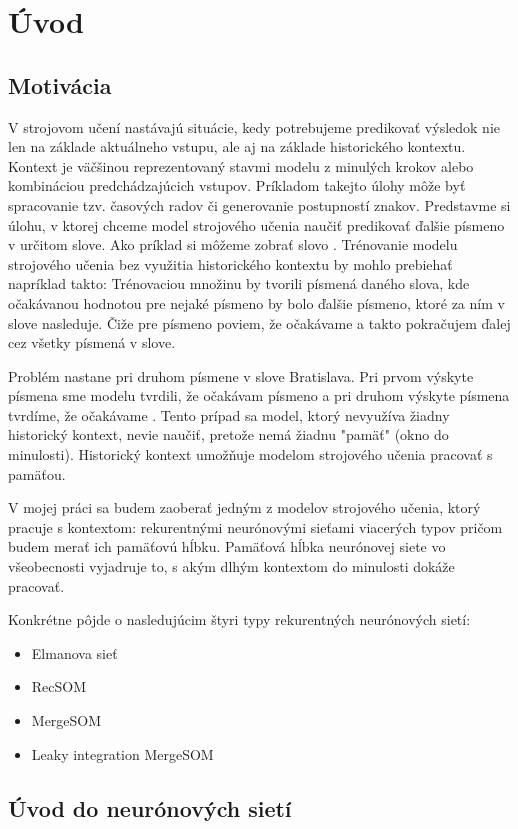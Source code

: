 \chapter{Úvod}

\section{Motivácia}
V strojovom učení nastávajú situácie, kedy potrebujeme predikovať výsledok nie len na 
základe aktuálneho vstupu, 
ale aj na základe historického kontextu. 
Kontext je väčšinou reprezentovaný stavmi modelu z minulých krokov alebo kombináciou predchádzajúcich vstupov.
Príkladom takejto úlohy môže byť spracovanie tzv. časových radov či generovanie postupností znakov.
Predstavme si úlohu, v ktorej chceme model strojového učenia naučiť predikovať ďalšie písmeno v určitom slove. 
Ako príklad si môžeme zobrať slovo . 
Trénovanie modelu strojového učenia bez využitia historického kontextu by mohlo prebiehať napríklad takto:
Trénovaciou množinu by tvorili písmená daného slova, kde očakávanou hodnotou pre nejaké písmeno by bolo ďalšie písmeno, ktoré za ním v slove nasleduje.
Čiže pre písmeno  poviem, že očakávame  a takto pokračujem ďalej cez všetky písmená v slove.

Problém nastane pri druhom písmene  v slove Bratislava. Pri prvom výskyte písmena  sme modelu tvrdili, že očakávam písmeno  a 
pri druhom výskyte písmena  tvrdíme, že očakávame . 
Tento prípad sa model, ktorý nevyužíva žiadny historický kontext, nevie naučiť, pretože nemá žiadnu "pamäť" (okno do minulosti). 
Historický kontext umožňuje modelom strojového učenia pracovať s pamäťou.

V mojej práci sa budem zaoberať jedným z modelov strojového učenia, ktorý pracuje s kontextom: rekurentnými neurónovými sieťami viacerých typov pričom
budem merať ich pamäťovú hĺbku. 
Pamäťová hĺbka neurónovej siete vo všeobecnosti vyjadruje to, s akým dlhým kontextom do minulosti dokáže pracovať.

Konkrétne pôjde o nasledujúcim štyri typy rekurentných neurónových sietí:
\begin{itemize}
	\item Elmanova sieť
	\item RecSOM
	\item MergeSOM
	\item Leaky integration MergeSOM
\end{itemize}

\section{Úvod do neurónových sietí}

